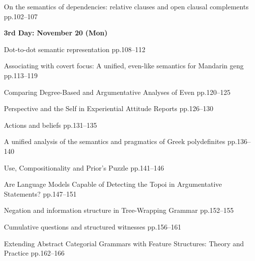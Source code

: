 \documentclass[12pt]{jarticle}
\begin{document}
     {On the semantics of dependencies: relative clauses and open clausal complements}
     {pp.102--107}







\noindent\textbf{\large 
3rd Day: November 20 (Mon)
}\\







  
     {Dot-to-dot semantic representation}
     {pp.108--112}
  
     {Associating with covert focus: A unified, even-like semantics for Mandarin geng}
     {pp.113--119}
  
     {Comparing Degree-Based and Argumentative Analyses of Even}
     {pp.120--125}




  
     {Perspective and the Self in Experiential Attitude Reports}
     {pp.126--130}
  
     {Actions and beliefs}
     {pp.131--135}
  
     {A unified analysis of the semantics and pragmatics of Greek polydefinites}
     {pp.136--140}







  
     {Use, Compositionality and Prior's Puzzle}
     {pp.141--146}
  
     {Are Language Models Capable of Detecting the Topoi in Argumentative Statements?}
     {pp.147--151}
  
     {Negation and information structure in Tree-Wrapping Grammar}
     {pp.152--155}







  
     {Cumulative questions and structured witnesses}
     {pp.156--161}
  
     {Extending Abstract Categorial Grammars with Feature Structures: Theory and Practice}
     {pp.162--166}






  
\end{document}
